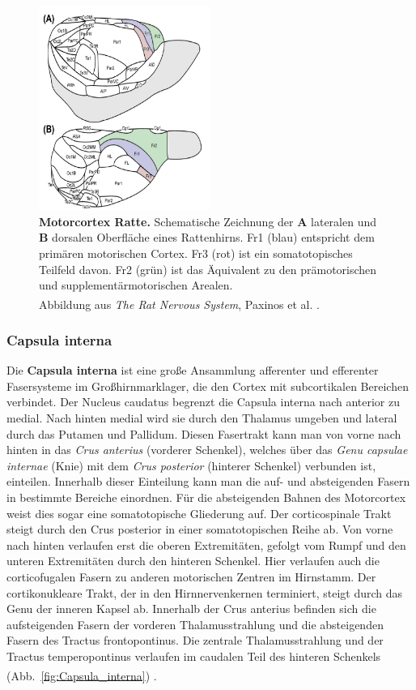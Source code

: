 \documentclass[12pt,a4paper,pdftex]{article}
\begin{document}
\begin{figure}[H]
    \centering
    \includegraphics[width=0.5\textwidth]{pictures/Bilder_Laura/rat_motorcortex_1.png}
    \caption[Motorcortex Ratte]{\textbf{Motorcortex Ratte.} Schematische Zeichnung der \textbf{A} lateralen und \textbf{B} dorsalen Oberfläche eines Rattenhirns. Fr1 (blau) entspricht dem primären motorischen Cortex. Fr3 (rot) ist ein somatotopisches Teilfeld davon. Fr2 (grün) ist das Äquivalent zu den prämotorischen und supplementärmotorischen Arealen. \\ Abbildung aus \textit{The Rat Nervous System}, Paxinos et al. \textsuperscript{\cite[22]{paxinos2014rat}}.}
    \label{fig:motorcortex_ratte}
\end{figure}


\subsubsection*{Capsula interna} 
Die \textbf{Capsula interna} ist eine große Ansammlung afferenter und efferenter Fasersysteme im Großhirnmarklager, die den Cortex mit subcortikalen Bereichen verbindet. Der Nucleus caudatus begrenzt die Capsula interna nach anterior zu medial. Nach hinten medial wird sie durch den Thalamus umgeben und lateral durch das Putamen und Pallidum. Diesen Fasertrakt kann man von vorne nach hinten in das \textit{Crus anterius} (vorderer Schenkel), welches über das \textit{Genu capsulae internae} (Knie) mit dem \textit{Crus posterior} (hinterer Schenkel) verbunden ist, einteilen. Innerhalb dieser Einteilung kann man die auf- und absteigenden Fasern in bestimmte Bereiche einordnen. Für die absteigenden Bahnen des Motorcortex weist dies sogar eine somatotopische Gliederung auf. Der corticospinale Trakt steigt durch den Crus posterior in einer somatotopischen Reihe ab. Von vorne nach hinten verlaufen erst die oberen Extremitäten, gefolgt vom Rumpf und den unteren Extremitäten durch den hinteren Schenkel. Hier verlaufen auch die corticofugalen Fasern zu anderen motorischen Zentren im Hirnstamm. Der cortikonukleare Trakt, der in den Hirnnervenkernen terminiert, steigt durch das Genu der inneren Kapsel ab. Innerhalb der Crus anterius befinden sich die aufsteigenden Fasern der vorderen Thalamusstrahlung und die absteigenden Fasern des Tractus frontopontinus. Die zentrale Thalamusstrahlung und der Tractus temperopontinus verlaufen im caudalen Teil des hinteren Schenkels (Abb.~\ref{fig:Capsula_interna}) \textsuperscript{\cite[9]{trepel2011neuroanatomie}}.
\end{document}
